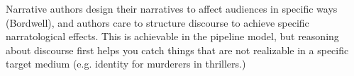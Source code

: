 Narrative authors design their narratives to affect audiences in specific
ways (Bordwell), and authors care to structure discourse to achieve
specific narratological effects.  This is achievable in the pipeline model,
but reasoning about discourse first helps you catch things that are not
realizable in a specific target medium (e.g. identity for murderers in
thrillers.)




